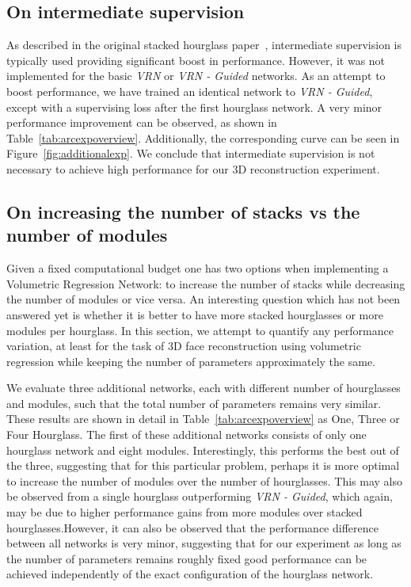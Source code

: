 \subsection{On intermediate supervision}
\label{sec:arc_intersup}

As described in the original stacked hourglass
paper~\cite{newell2016stacked}, intermediate supervision is typically
used providing significant boost in performance. However, it was not
implemented for the basic \textit{VRN} or \textit{VRN - Guided}
networks. As an attempt to boost performance, we have trained an
identical network to \textit{VRN - Guided}, except with a supervising
loss after the first hourglass network. A very minor performance
improvement can be observed, as shown in
Table~\ref{tab:arcexpoverview}. Additionally, the corresponding curve
can be seen in Figure~\ref{fig:additionalexp}. We conclude that
intermediate supervision is not necessary to achieve high performance
for our 3D reconstruction experiment.



\subsection{On increasing the number of stacks vs the number of modules}
\label{sec:arc_secvsmod}

Given a fixed computational budget one has two options when
implementing a Volumetric Regression Network: to increase the number
of stacks while decreasing the number of modules or vice versa.  An
interesting question which has not been answered yet is whether it is
better to have more stacked hourglasses or more modules per
hourglass. In this section, we attempt to quantify any performance
variation, at least for the task of 3D face reconstruction using
volumetric regression while keeping the number of parameters
approximately the same.

We evaluate three additional networks, each with different number of
hourglasses and modules, such that the total number of parameters
remains very similar. These results are shown in detail in
Table~\ref{tab:arcexpoverview} as One, Three or Four Hourglass. The
first of these additional networks consists of only one hourglass
network and eight modules. Interestingly, this performs the best out
of the three, suggesting that for this particular problem, perhaps it
is more optimal to increase the number of modules over the number of
hourglasses. This may also be observed from a single hourglass
outperforming \textit{VRN - Guided}, which again, may be due to higher
performance gains from more modules over stacked hourglasses.However,
it can also be observed that the performance difference between all
networks is very minor, suggesting that for our experiment as long as
the number of parameters remains roughly fixed good performance can be
achieved independently of the exact configuration of the hourglass
network.


